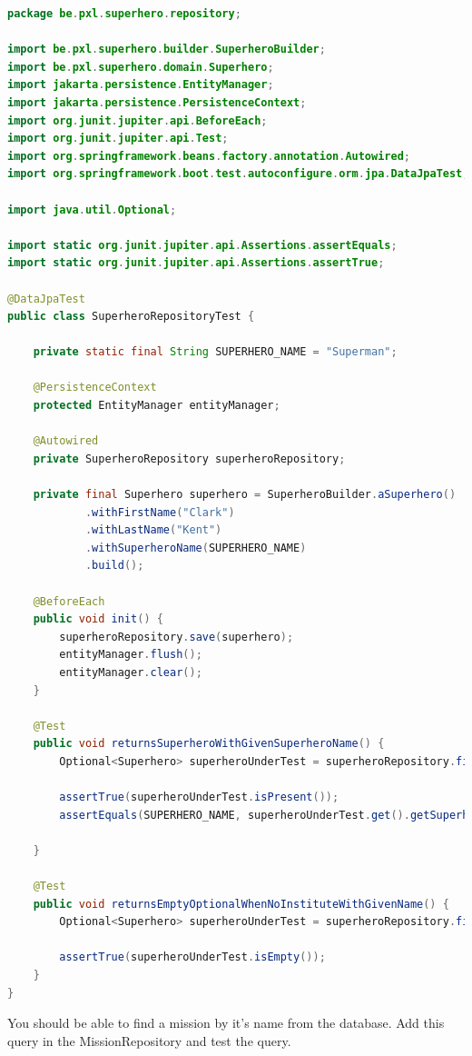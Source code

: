 \begin{lstlisting}[frame=single, language=java]
package be.pxl.superhero.repository;

import be.pxl.superhero.builder.SuperheroBuilder;
import be.pxl.superhero.domain.Superhero;
import jakarta.persistence.EntityManager;
import jakarta.persistence.PersistenceContext;
import org.junit.jupiter.api.BeforeEach;
import org.junit.jupiter.api.Test;
import org.springframework.beans.factory.annotation.Autowired;
import org.springframework.boot.test.autoconfigure.orm.jpa.DataJpaTest;

import java.util.Optional;

import static org.junit.jupiter.api.Assertions.assertEquals;
import static org.junit.jupiter.api.Assertions.assertTrue;

@DataJpaTest
public class SuperheroRepositoryTest {

	private static final String SUPERHERO_NAME = "Superman";

	@PersistenceContext
	protected EntityManager entityManager;

	@Autowired
	private SuperheroRepository superheroRepository;

	private final Superhero superhero = SuperheroBuilder.aSuperhero()
			.withFirstName("Clark")
			.withLastName("Kent")
			.withSuperheroName(SUPERHERO_NAME)
			.build();

	@BeforeEach
	public void init() {
		superheroRepository.save(superhero);
		entityManager.flush();
		entityManager.clear();
	}

	@Test
	public void returnsSuperheroWithGivenSuperheroName() {
		Optional<Superhero> superheroUnderTest = superheroRepository.findSuperheroBySuperheroName(SUPERHERO_NAME);

		assertTrue(superheroUnderTest.isPresent());
		assertEquals(SUPERHERO_NAME, superheroUnderTest.get().getSuperheroName());

	}

	@Test
	public void returnsEmptyOptionalWhenNoInstituteWithGivenName() {
		Optional<Superhero> superheroUnderTest = superheroRepository.findSuperheroBySuperheroName("Robin Hood");

		assertTrue(superheroUnderTest.isEmpty());
	}
}
\end{lstlisting}

\begin{oefening}
You should be able to find a mission by it's name from the database. Add this query in the MissionRepository and test the query.
\end{oefening}



